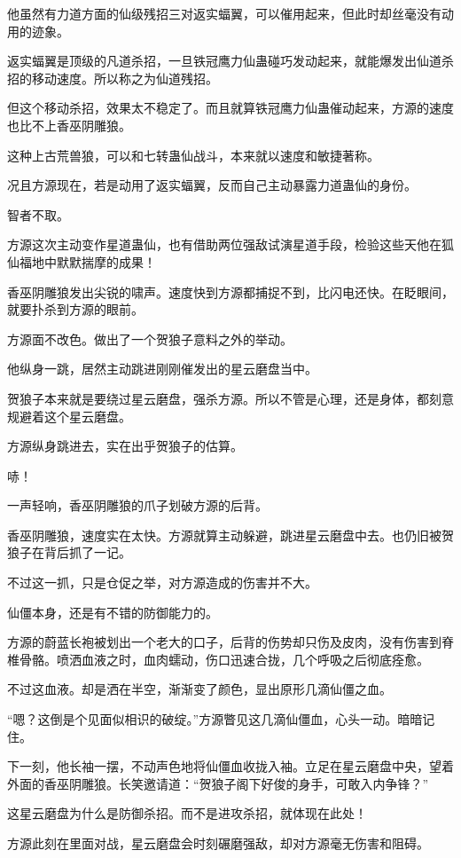 \begin{this_body}
他虽然有力道方面的仙级残招三对返实蝠翼，可以催用起来，但此时却丝毫没有动用的迹象。

返实蝠翼是顶级的凡道杀招，一旦铁冠鹰力仙蛊碰巧发动起来，就能爆发出仙道杀招的移动速度。所以称之为仙道残招。

但这个移动杀招，效果太不稳定了。而且就算铁冠鹰力仙蛊催动起来，方源的速度也比不上香巫阴雕狼。

这种上古荒兽狼，可以和七转蛊仙战斗，本来就以速度和敏捷著称。

况且方源现在，若是动用了返实蝠翼，反而自己主动暴露力道蛊仙的身份。

智者不取。

方源这次主动变作星道蛊仙，也有借助两位强敌试演星道手段，检验这些天他在狐仙福地中默默揣摩的成果！

香巫阴雕狼发出尖锐的啸声。速度快到方源都捕捉不到，比闪电还快。在眨眼间，就要扑杀到方源的眼前。

方源面不改色。做出了一个贺狼子意料之外的举动。

他纵身一跳，居然主动跳进刚刚催发出的星云磨盘当中。

贺狼子本来就是要绕过星云磨盘，强杀方源。所以不管是心理，还是身体，都刻意规避着这个星云磨盘。

方源纵身跳进去，实在出乎贺狼子的估算。

哧！

一声轻响，香巫阴雕狼的爪子划破方源的后背。

香巫阴雕狼，速度实在太快。方源就算主动躲避，跳进星云磨盘中去。也仍旧被贺狼子在背后抓了一记。

不过这一抓，只是仓促之举，对方源造成的伤害并不大。

仙僵本身，还是有不错的防御能力的。

方源的蔚蓝长袍被划出一个老大的口子，后背的伤势却只伤及皮肉，没有伤害到脊椎骨骼。喷洒血液之时，血肉蠕动，伤口迅速合拢，几个呼吸之后彻底痊愈。

不过这血液。却是洒在半空，渐渐变了颜色，显出原形几滴仙僵之血。

“嗯？这倒是个见面似相识的破绽。”方源瞥见这几滴仙僵血，心头一动。暗暗记住。

下一刻，他长袖一摆，不动声色地将仙僵血收拢入袖。立足在星云磨盘中央，望着外面的香巫阴雕狼。长笑邀请道：“贺狼子阁下好俊的身手，可敢入内争锋？”

这星云磨盘为什么是防御杀招。而不是进攻杀招，就体现在此处！

方源此刻在里面对战，星云磨盘会时刻碾磨强敌，却对方源毫无伤害和阻碍。


\end{this_body}
